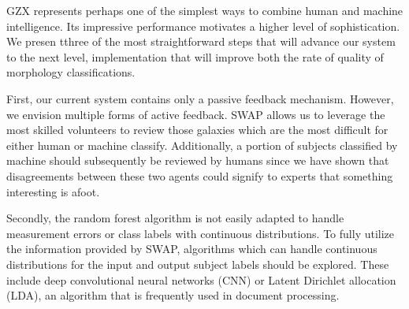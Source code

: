 \documentclass[twocolumn]{aastex6}
\newcommand{\feat}{`Featured'}
\newcommand{\notfeat}{`Not'}
\begin{document}
GZX represents perhaps one of the simplest ways to combine human
and machine intelligence. Its impressive performance motivates a higher 
level of sophistication. We presen tthree of the most 
straightforward steps that will advance our system to the next level, implementation
that will improve both the rate of quality of morphology classifications. 

First, our current system contains only a passive feedback mechanism. However,  
we envision multiple forms of active feedback.  SWAP allows us to leverage the 
most skilled volunteers to review those galaxies which are the most difficult for either
 human or machine classify. Additionally, a portion of subjects classified by machine 
should subsequently be reviewed by humans since we have shown that disagreements 
between these two agents could signify to experts that something interesting is afoot. 


Secondly, the random forest algorithm is not easily adapted to handle measurement 
errors or class labels with continuous distributions. To fully utilize the information provided by
SWAP, algorithms which can handle continuous distributions for the input and output 
subject labels should be explored. 
These include deep convolutional neural networks (CNN) or Latent Dirichlet allocation (LDA), 
an algorithm that is frequently used in document processing. 

\end{document}
